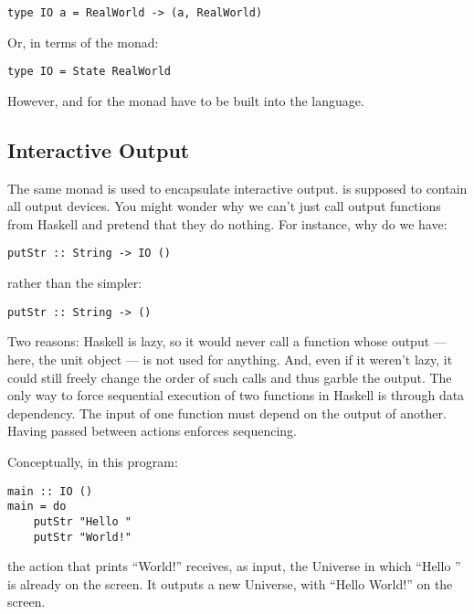 \begin{Verbatim}[commandchars=\\\{\}]
type IO a = RealWorld -> (a, RealWorld)
\end{Verbatim}
Or, in terms of the  monad:

\begin{Verbatim}[commandchars=\\\{\}]
type IO = State RealWorld
\end{Verbatim}
However, \code{>=>} and  for
the  monad have to be built into the language.

\subsection{Interactive Output}\label{interactive-output}

The same  monad is used to encapsulate interactive output.
 is supposed to contain all output devices. You might
wonder why we can't just call output functions from Haskell and pretend
that they do nothing. For instance, why do we have:

\begin{Verbatim}[commandchars=\\\{\}]
putStr :: String -> IO ()
\end{Verbatim}
rather than the simpler:

\begin{Verbatim}[commandchars=\\\{\}]
putStr :: String -> ()
\end{Verbatim}
Two reasons: Haskell is lazy, so it would never call a function whose
output --- here, the unit object --- is not used for anything. And, even
if it weren't lazy, it could still freely change the order of such calls
and thus garble the output. The only way to force sequential execution
of two functions in Haskell is through data dependency. The input of one
function must depend on the output of another. Having 
passed between  actions enforces sequencing.

Conceptually, in this program:

\begin{Verbatim}[commandchars=\\\{\}]
main :: IO () 
main = do 
    putStr "Hello "
    putStr "World!"
\end{Verbatim}
the action that prints ``World!'' receives, as input, the Universe in
which ``Hello '' is already on the screen. It outputs a new Universe,
with ``Hello World!'' on the screen.

